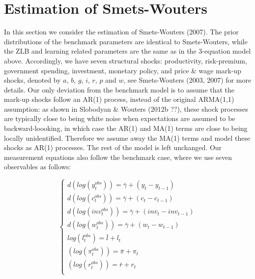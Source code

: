 \documentclass[12pt,reqno]{article}
\numberwithin{equation}{section}
\begin{document}
\begin{figure}[H]
\end{figure}

\section{Estimation of Smets-Wouters}

In this section we consider the estimation of Smets-Wouters (2007). The prior distributions of the benchmark parameters are identical to Smets-Wouters, while the ZLB and learning related parameters are the same as in the 3-equation model above. Accordingly, we have seven structural shocks: productivity, risk-premium, government spending, investment, monetary policy, and 
price \& wage mark-up shocks, denoted by $a$, $b$, $g$, $i$, $r$, $p$ and $w$, see Smets-Wouters (2003, 2007) for more details. Our only deviation from the benchmark model is to assume that the mark-up shocks follow an AR(1) process, instead of the original ARMA(1,1) assumption: as shown in Slobodyan \& Wouters (2012b ??), these shock processes are typically close to being white noise when expectations are assumed to be backward-loooking, in which case the AR(1) and MA(1) terms are close to being locally unidentified. Therefore we assume away the MA(1) terms and model these shocks as AR(1) processes. The rest of the model is left unchanged. Our measurement equations also follow the benchmark case, where we use seven observables as follows:

$$
\begin{cases}
 d( log(y^{obs}_t)) = \bar{\gamma} + (y_t - y_{t-1} ) \\
d(log(c^{obs}_t)) = \bar{\gamma} + (c_t - c_{t-1} )\\
d(log({inv}^{obs}_t)) = \bar{\gamma} + ({inv}_t - inv_{t-1} )\\
d(log(w^{obs}_t)) = \bar{\gamma} + (w_t - w_{t-1} )\\
log(l^{obs}_t) = \bar{l} + l_t\\
(log(\pi^{obs}_t)) = \bar{\pi} + \pi_t \\
(log(r^{obs}_t)) = \bar{r} + r_t\\
\end{cases}
$$
\end{document}
